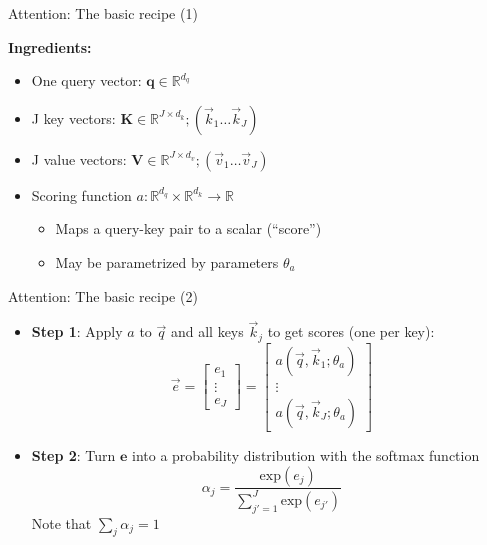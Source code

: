 \documentclass[11pt,compress,t,notes=noshow, xcolor=table]{beamer}
\begin{document}
\begin{frame}{Attention: The basic recipe (1)}

\vfill

\textbf{Ingredients:}

\begin{itemize}
	\item One query vector: $\mathbf{q} \in \mathbb{R}^{d_q}$
	\item J key vectors: $\mathbf{K} \in \mathbb{R}^{J \times d_k}; (\vec k_1 \ldots \vec k_J)$
	\item J value vectors: $\mathbf{V} \in \mathbb{R}^{J \times d_v}; (\vec v_1 \ldots \vec v_J)$
	\item Scoring function $a : \mathbb{R}^{d_q} \times \mathbb{R}^{d_k} \rightarrow \mathbb{R}$
		\begin{itemize}
			\item Maps a query-key pair to a scalar (``score'')
			\item May be parametrized by parameters $\theta_a$
		\end{itemize}
\end{itemize}

\vfill

\end{frame}


\begin{frame}{Attention: The basic recipe (2)}

\vfill

\begin{itemize}
	\item \textbf{Step 1}: Apply $a$ to $\vec q$ and all keys $\vec k_j$ to get scores (one per key): 
	$$\vec e = \begin{bmatrix} e_1 \\ \vdots \\ e_J \end{bmatrix} =  \begin{bmatrix} a(\vec q, \vec k_1; \theta_a) \\ \vdots \\ a(\vec q, \vec k_J; \theta_a) \end{bmatrix}$$
	\item \textbf{Step 2}: Turn $\mathbf{e}$ into a probability distribution with the softmax function
	$$\alpha_j = \frac{\mathrm{exp}(e_j)}{\sum_{j'=1}^J \mathrm{exp}(e_{j'})}$$
		    Note that $\sum_j \alpha_j = 1$

\end{itemize}

\vfill

\end{frame}
\end{document}
